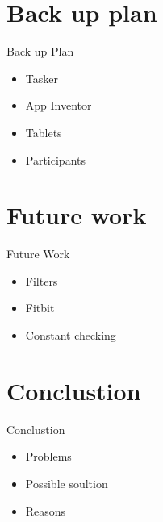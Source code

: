 \documentclass[handout,t]{beamer}
\begin{document}
\section{Back up plan}
\begin{frame}{Back up Plan}
\begin{itemize}
\item Tasker 
\item App Inventor 
\item Tablets 
\item Participants 
\end{itemize}

\end{frame}

\section{Future work}
\begin{frame}{Future Work}

  \begin{itemize}
    \item Filters 
    \item Fitbit
    \item Constant checking 
  \end{itemize}
 
 


  
\end{frame}




 \section{Conclustion}
 \begin{frame}{Conclustion}
 \begin{itemize}
  \item Problems 
 \item Possible soultion 
 \item Reasons 
 \end{itemize}

 \end{frame}
 

\end{document}
